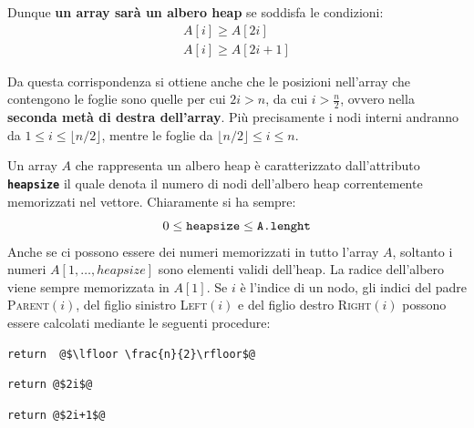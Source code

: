 Dunque \textbf{un array sarà un albero heap} se soddisfa le condizioni:
\begin{eqnarray}
	 A[i]\geq A[2i]  \label{eq:heap1}\\
	A[i]\geq A[2i+1] \label{eq:heap2}
\end{eqnarray}

Da questa corrispondenza si ottiene anche che le posizioni nell'array che contengono le foglie sono quelle per cui $2i>n$, da cui $i > \frac{n}{2}$, ovvero nella \textbf{seconda metà di destra dell'array}. Più precisamente i nodi interni andranno da $1 \leq i \leq \lfloor n/2 \rfloor$, mentre le foglie da $\lfloor n/2 \rfloor \leq i \leq n$.

Un array $A$ che rappresenta un albero heap è caratterizzato dall'attributo \texttt{\textbf{heapsize}} il quale denota il numero di nodi dell'albero heap correntemente memorizzati nel vettore. Chiaramente si ha sempre:
\begin{displaymath}
	0 \leq \text{\texttt{heapsize}} \leq \text{\texttt{A.lenght}}
\end{displaymath}
Anche se ci possono essere dei numeri memorizzati in tutto l'array $A$, soltanto i numeri $A[1,\ldots,heapsize]$ sono elementi validi dell'heap. La radice dell'albero viene sempre memorizzata in $A[1]$. Se $i$ è l'indice di un nodo, gli indici del padre \textsc{Parent}$(i)$, del figlio sinistro \textsc{Left}$(i)$ e del figlio destro \textsc{Right}$(i)$ possono essere calcolati mediante le seguenti procedure:
\begin{minipage}{.3\textwidth}
	\begin{lstlisting}[caption={\textsc{Parent}(i)},language=asd]
		return  @$\lfloor \frac{n}{2}\rfloor$@
	\end{lstlisting}
\end{minipage}
\hfil
\begin{minipage}{.3\textwidth}
	\begin{lstlisting}[caption={\textsc{Left}(i)},language=asd]
		return @$2i$@
	\end{lstlisting}
\end{minipage}
\hfil
\begin{minipage}{.3\textwidth}
	\begin{lstlisting}[caption={\textsc{Right}(i)},language=asd]
		return @$2i+1$@
	\end{lstlisting}
\end{minipage}


